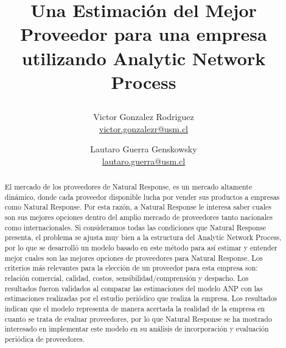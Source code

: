 \documentclass[12pt,twocolumn]{article}
\begin{document}
\begin{titlepage}
\title{\begin{Large}Una Estimación del Mejor Proveedor para una empresa utilizando Analytic Network Process\end{Large}} 
\author{Victor Gonzalez Rodriguez\\\url{victor.gonzalezr@usm.cl} \\
\and Lautaro Guerra Genskowsky\\\url{lautaro.guerra@usm.cl}}
\maketitle

\begin{abstract}
El mercado de los proveedores de Natural Response, es un mercado altamente dinámico, donde cada proveedor disponible lucha por vender sus productos a empresas como Natural Response. Por esta razón, a Natural Response le interesa saber cuales son sus mejores opciones dentro del amplio mercado de proveedores tanto nacionales como internacionales. Si consideramos todas las condiciones que Natural Response presenta, el problema se ajusta muy bien a la estructura del Analytic Network Process, por lo que se desarrolló un modelo basado en este método para así estimar y entender mejor cuales son las mejores opciones de proveedores para Natural Response. Los criterios más relevantes para la elección de un proveedor para esta empresa son: relación comercial, calidad, costos, sensibilidad/comprensión y despacho. Los resultados fueron validados al comparar las estimaciones del modelo ANP con las estimaciones realizadas por el estudio periódico que realiza la empresa. Los resultados indican que el modelo representa de manera acertada la realidad de la empresa en cuanto se trata de evaluar proveedores, por lo que Natural Response se ha mostrado interesado en implementar este modelo en su análisis de incorporación y evaluación periódica de proveedores.
\end{abstract}
\end{titlepage}
\newpage
\onecolumn
\tableofcontents
\newpage
\twocolumn
\end{document}
